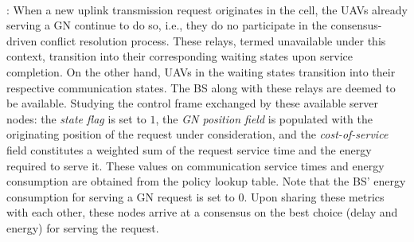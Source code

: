 \documentclass[10pt,twocolumn]{IEEEtran}
\begin{document}
\\: When a new uplink transmission request originates in the cell, the UAVs already serving a GN continue to do so, i.e., they do no participate in the consensus-driven conflict resolution process. These relays, termed unavailable under this context, transition into their corresponding waiting states upon service completion. On the other hand, UAVs in the waiting states transition into their respective communication states. The BS along with these relays are deemed to be available. Studying the control frame exchanged by these available server nodes: the \textit{state flag} is set to $1$, the \textit{GN position field} is populated with the originating position of the request under consideration, and the \textit{cost-of-service} field constitutes a weighted sum of the request service time and the energy required to serve it. These values on communication service times and energy consumption are obtained from the policy lookup table. Note that the BS' energy consumption for serving a GN request is set to $0$. Upon sharing these metrics with each other, these nodes arrive at a consensus on the best choice (delay and energy) for serving the request.

\vspace{-6mm}
\end{document}
